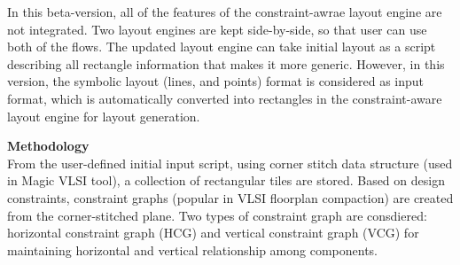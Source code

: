 \documentclass[11pt]{article}
\begin{document}
In this beta-version, all of the features of the constraint-awrae layout engine are not integrated. Two layout engines are kept side-by-side, so that user can use both of the flows. The updated layout engine can take initial layout as a script describing all rectangle information that makes it more generic. However, in this version, the symbolic layout (lines, and points) format is considered as input format, which is automatically converted into rectangles in the constraint-aware layout engine for layout generation.

\textbf{Methodology}\\
From the user-defined initial input script, using corner stitch data structure (used in Magic VLSI tool), a collection of rectangular tiles are stored. Based on design constraints, constraint graphs (popular in VLSI floorplan compaction) are created from the corner-stitched plane. Two types of constraint graph are consdiered: horizontal constraint graph (HCG) and vertical constraint graph (VCG) for maintaining horizontal and vertical relationship among components. 
\end{document}
